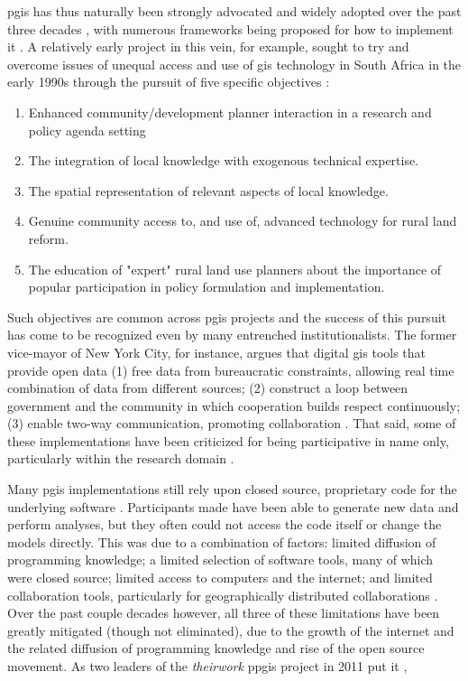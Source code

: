 \ac{pgis} has thus naturally been strongly advocated and widely adopted over the past three decades \cite{drummondFutureGISPlanning2008}, with numerous frameworks being proposed for how to implement it \cite{brommelstroetPlanningSupportSystems2010}. A relatively early project in this vein, for example, sought to try and overcome issues of unequal access and use of \ac{gis} technology in South Africa in the early 1990s through the pursuit of five specific objectives \cite{harrisPursuingSocialGoals1994}: 

\begin{enumerate}[itemsep=0pt,parsep=0pt]
	\item{Enhanced community/development planner interaction in a research and policy agenda setting}
	\item{The integration of local knowledge with exogenous technical expertise.}
	\item{The spatial representation of relevant aspects of local knowledge.}
	\item{Genuine community access to, and use of, advanced technology for rural land reform.}
	\item{The education of "expert" rural land use planners about the importance of popular participation in policy formulation and implementation.}
\end{enumerate}

Such objectives are common across \ac{pgis} projects and the success of this pursuit has come to be recognized even by many entrenched institutionalists. The former vice-mayor of New York City, for instance, argues that digital \ac{gis} tools that provide open data (1) free data from bureaucratic constraints, allowing real time combination of data from different sources; (2) construct a loop between government and the community in which cooperation builds respect continuously; (3) enable two-way communication, promoting collaboration \cite{goldsmithResponsiveCityEngaging2014}. That said, some of these implementations have been criticized for being participative in name only, particularly within the research domain \cite{tebrommelstroetRelevanceResearchPlanning2009}.


Many \ac{pgis} implementations still rely upon closed source, proprietary code for the underlying software \cite{heikkilaGISDeadLong1998}. Participants made have been able to generate new data and perform analyses, but they often could not access the code itself or change the models directly. This was due to a combination of factors: limited diffusion of programming knowledge; a limited selection of software tools, many of which were closed source; limited access to computers and the internet; and limited collaboration tools, particularly for geographically distributed collaborations \cite{cramptonIntroductionCriticalCartography2005}. Over the past couple decades however, all three of these limitations have been greatly mitigated (though not eliminated), due to the growth of the internet and the related diffusion of programming knowledge and rise of the open source movement. As two leaders of the \textit{theirwork} \ac{ppgis} project in 2011 put it \cite{williamsonTheirworkDevelopmentSustainable2011}, 

